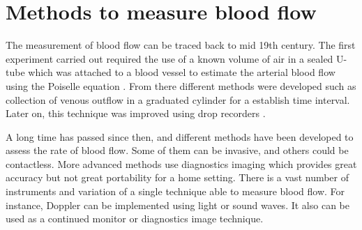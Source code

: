 %


\section{Methods to measure blood flow}
The measurement of blood flow can be traced back to mid 19th century. The first experiment carried out required the use of a known volume of air in a sealed U-tube which was attached to a blood vessel to estimate the arterial blood flow using the Poiselle equation \cite{dokunin1958modification}. From there different methods were developed such as collection of venous outflow in a graduated cylinder for a establish time interval. Later on, this technique was improved using drop recorders \cite{jayanthy2011measuring}.

A long time has passed since then, and different methods have been developed to assess the rate of blood flow. Some of them can be invasive, and others could be contactless. More advanced methods use diagnostics imaging which provides great accuracy but not great portability for a home setting. There is a vast number of instruments and variation of a single technique able to measure blood flow. For instance, Doppler can be implemented using light or sound waves. It also can be used as a continued monitor or diagnostics image technique. 

